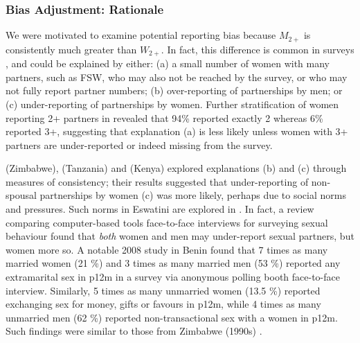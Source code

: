 \subsubsection{Bias Adjustment: Rationale}\label{mod.par.wp.rat}
We were motivated to examine potential reporting bias because
$M_{2+}$ is consistently much greater than $W_{2+}$.
In fact, this difference is common in surveys \cite{Todd2009,Higgins2010},
and could be explained by either:
(a) a small number of women with many partners,
such as FSW, who may also not be reached by the survey,
or who may not fully report partner numbers;
(b) over-reporting of partnerships by men; or
(c) under-reporting of partnerships by women.
Further stratification of women reporting 2+ partners in \cite[Table~14.7.1]{SDHS2006}
revealed that 94\% reported exactly 2 whereas 6\% reported 3+,
suggesting that explanation (a) is less likely unless
women with 3+ partners are under-reported or indeed missing from the survey.
\par
\citet{Gregson2002bias} (Zimbabwe), \citet{Nnko2004} (Tanzania) and \citet{Clark2011} (Kenya)
explored explanations (b) and (c) through measures of consistency; their results suggested that
under-reporting of non-spousal partnerships by women (c) was more likely,
perhaps due to social norms and pressures.
Such norms in Eswatini are explored in \cite{Ruark2014,Fielding-Miller2016,Ruark2019,Pulerwitz2021}.
In fact, a review comparing computer-based tools \vs face-to-face interviews
for surveying sexual behaviour \cite{Langhaug2010} found that
\emph{both} women and men may under-report sexual partners, but women more so.
A notable 2008 study in Benin \cite{Behanzin2013} found that
7 times as many married women (21 \%) and 3 times as many married men (53 \%)
reported any extramarital sex in p12m
in a survey via anonymous polling booth \vs face-to-face interview.
Similarly, 5 times as many unmarried women (13.5 \%) reported
exchanging sex for money, gifts or favours in p12m, while
4 times as many unmarried men (62 \%) reported non-transactional sex with a women in p12m.
Such findings were similar to those from Zimbabwe (1990s) \cite{Gregson2002bias}.
